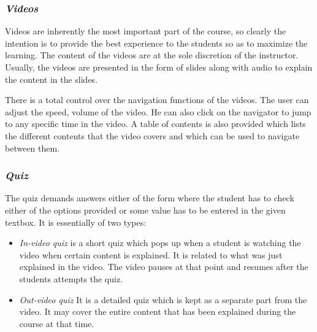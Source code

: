 \subsubsection*{\textit{Videos}}
\hspace{0.35cm} Videos are inherently the most important part of the course, so clearly the intention is to provide the best experience to the students so as to maximize the learning. The content of the videos are at the sole discretion of the instructor. Usually, the videos are presented in the form of slides along with audio to explain the content in the slides.
\par There is a total control over the navigation functions of the videos. The user can adjust the speed, volume of the video. He can also click on the navigator to jump to any specific time in the video. A table of contents is also provided which lists the different contents that the video covers and which can be used to navigate between them.

\subsubsection*{\textit{Quiz}}
The quiz demands answers either of the form where the student has to check either of the options provided or some value has to be entered in the given textbox. It is essentially of two types: 
\begin{itemize}
	\item \emph{In-video quiz} is a short quiz which pops up when a student is watching the video when certain content is explained. It is related to what was just explained in the video. The video pauses at that point and resumes after the students attempts the quiz.
	\item \emph{Out-video quiz} It is a detailed quiz which is kept as a separate part from the video. It may cover the entire content that has been explained during the course at that time.
\end{itemize}